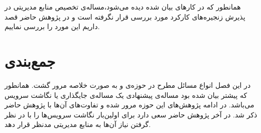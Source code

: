 همانطور که در کارهای بیان شده دیده می‌شود،‌مساله‌ی تخصیص منابع مدیریتی در پذیرش زنجیره‌های کارکرد
مورد بررسی قرار نگرفته است و در پژوهش حاضر قصد داریم این مورد را بررسی نماییم.

\section{جمع‌بندی}

در این فصل انواع مسائل مطرح در حوزه‌ی  و 
به صورت خلاصه مرور گشت. همانطور که پیشتر بیان شده بود مساله‌ی پیشنهادی یک مساله‌ی جایگذاری
یا نگاشت سرویس می‌باشد.
در ادامه پژوهش‌های این حوزه مرور شده و تفاوت‌های آن‌ها با پژوهش حاضر ذکر شد.
در آخر پژوهش حاضر سعی دارد برای اولین‌بار نگاشت سرویس‌ها را با در نظر گرفتن نیاز آن‌ها
به منابع مدیریتی مدنظر قرار دهد.